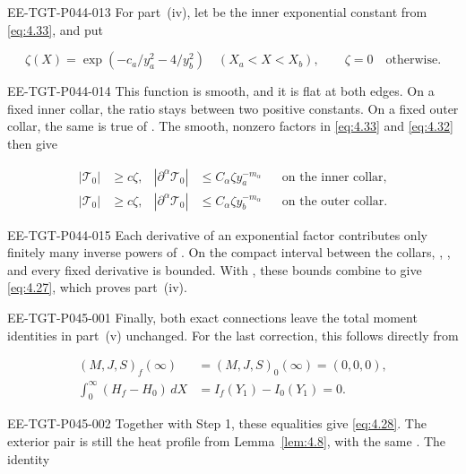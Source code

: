 \begin{EESegment}{EE-TGT-P044-013}
For part~\textup{(iv)}, let  be the inner exponential constant
from \eqref{eq:4.33}, and put
\end{EESegment}
\[
\zeta(X)=\exp(-c_a/y_a^2-4/y_b^2)\quad(X_a<X<X_b),
\qquad \zeta=0\quad\text{otherwise}.
\]
\begin{EESegment}{EE-TGT-P044-014}
This function is smooth, and it is flat at both edges. On a fixed inner collar, the ratio
 stays between two positive constants. On a fixed outer
collar, the same is true of . The smooth, nonzero factors
in \eqref{eq:4.33} and \eqref{eq:4.32} then give
\end{EESegment}
\begin{align*}
|\mathcal T_0|&\ge c\zeta,& |\partial^\alpha\mathcal T_0|&\le C_\alpha\zeta y_a^{-m_\alpha}
&&\text{on the inner collar},\\
|\mathcal T_0|&\ge c\zeta,& |\partial^\alpha\mathcal T_0|&\le C_\alpha\zeta y_b^{-m_\alpha}
&&\text{on the outer collar}.
\end{align*}
\begin{EESegment}{EE-TGT-P044-015}
Each derivative of an exponential factor contributes only finitely many inverse powers of
. On the compact interval between the collars,
, , and every fixed derivative
is bounded. With , these bounds combine to give
\eqref{eq:4.27}, which proves part~\textup{(iv)}.
\end{EESegment}
%
\begin{EESegment}{EE-TGT-P045-001}
Finally, both exact connections leave the total moment identities in part~\textup{(v)} unchanged.
For the last correction, this follows directly from
\end{EESegment}
\begin{align*}
(M,J,S)_f(\infty)&=(M,J,S)_0(\infty)=(0,0,0),\\
\int_0^\infty(H_f-H_0)\,dX&=I_f(Y_1)-I_0(Y_1)=0.
\end{align*}
\begin{EESegment}{EE-TGT-P045-002}
Together with Step 1, these equalities give \eqref{eq:4.28}. The exterior pair is still the heat
profile from Lemma~\ref{lem:4.8}, with the same
. The identity
\end{EESegment}
